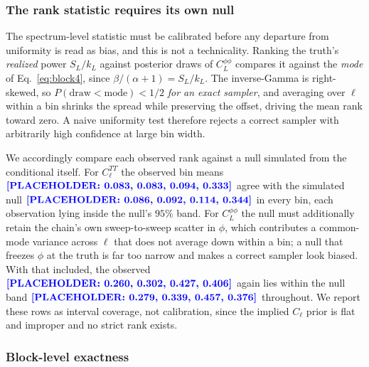 \documentclass[twocolumn,superscriptaddress,aps,prl,floatfix]{revtex4-2}
\newcommand{\cl}{C_\ell}
\newcommand{\clpp}{C_L^{\phi\phi}}
\newcommand{\placeholder}[1]{\textcolor{blue}{\textbf{[PLACEHOLDER: #1]}}}
\begin{document}
\subsubsection*{The rank statistic requires its own null}

The spectrum-level statistic must be calibrated before any departure from
uniformity is read as bias, and this is not a technicality. Ranking the truth's
\emph{realized} power $S_L/k_L$ against posterior draws of $\clpp$ compares
it against the \emph{mode} of Eq.~\eqref{eq:block4}, since
$\beta/(\alpha+1) = S_L/k_L$. The inverse-Gamma is right-skewed, so
$P(\text{draw} < \text{mode}) < 1/2$ \emph{for an exact sampler}, and averaging
over $\ell$ within a bin shrinks the spread while preserving the offset, driving
the mean rank toward zero. A naive uniformity test therefore rejects a correct
sampler with arbitrarily high confidence at large bin width.

We accordingly compare each observed rank against a null simulated from the
conditional itself. For $\cl^{TT}$ the observed bin means
$\placeholder{0.083, 0.083, 0.094, 0.333}$ agree with the simulated null
$\placeholder{0.086, 0.092, 0.114, 0.344}$ in every bin, each observation
lying inside the null's $95\%$ band. For $\clpp$ the null
must additionally retain the chain's own sweep-to-sweep scatter in $\phi$,
which contributes a common-mode variance across $\ell$ that does not average
down within a bin; a null that freezes $\phi$ at the truth is far too narrow
and makes a correct sampler look biased. With that included, the observed
$\placeholder{0.260, 0.302, 0.427, 0.406}$ again lies within the null band
$\placeholder{0.279, 0.339, 0.457, 0.376}$ throughout. We report these rows as interval coverage, not calibration, since
the implied $\cl$ prior is flat and improper and no strict rank exists.

\subsubsection*{Block-level exactness}
\end{document}
